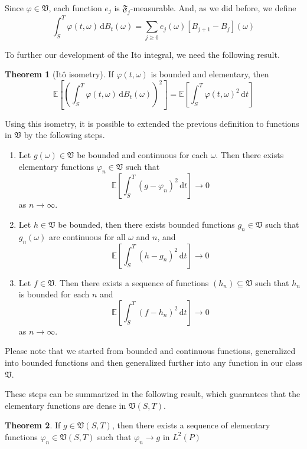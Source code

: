 \documentclass[12pt,a4paper]{article}
\theoremstyle{definition}
\newtheorem{theorem}{Theorem}[section]
\begin{document}
Since $\varphi \in \mathfrak{V}$, each function $e_j$ is $\mathfrak{F}_j$-measurable. And, as we did before, we define
\[
	\int_S^T \varphi (t, \omega) \, \mathrm{d}B_t(\omega) = \sum_{j \geq 0} e_j(\omega) [B_{j+1} - B_j](\omega)
\]

To further our development of the Ito integral, we need the following result.

\begin{theorem}[Itô isometry]
	If $\varphi(t, \omega)$ is bounded and elementary, then
	\[
		\mathbb{E}\left[\left( \int_S^T \varphi(t,\omega) \, \mathrm{d}B_t(\omega) \right)^2 \right] = \mathbb{E} \left[\int_S^T \varphi(t,\omega)^2 \, \mathrm{d}t \right]
	\]
\end{theorem}

Using this isometry, it is possible to extended the previous definition to functions in $\mathfrak{V}$ by the following steps.

\begin{enumerate}
	\item Let $g(\omega) \in \mathfrak{V}$ be bounded and continuous for each $\omega$. Then there exists elementary functions $\varphi_n \in \mathfrak{V}$ such that
	\[
		\mathbb{E} \left[ \int_S^T (g-\varphi_n)^2 \, \mathrm{d}t \right] \longrightarrow 0
	\]
	as $n \to \infty$.
	\item Let $h \in \mathfrak{V}$ be bounded, then there exists bounded functions $g_n \in \mathfrak{V}$ such that $g_n (\omega)$ are continuous for all $\omega$ and $n$, and
	\[
		\mathbb{E} \left[ \int_S^T (h-g_n)^2 \, \mathrm{d}t \right] \longrightarrow 0
	\]
	\item Let $f \in \mathfrak{V}$. Then there exists a sequence of functions $(h_n) \subseteq \mathfrak{V}$ such that $h_n$ is bounded for each $n$ and 
	\[
		\mathbb{E} \left[ \int_S^T (f-h_n)^2 \, \mathrm{d}t \right] \longrightarrow 0
	\]
	as $n \to \infty$.
\end{enumerate}

Please note that we started from bounded and continuous functions, generalized into bounded functions and then generalized further into any function in our class $\mathfrak{V}$.

These steps can be summarized in the following result, which guarantees that the elementary functions are dense in $\mathfrak{V}(S,T)$.

\begin{theorem}
If $g\in \mathfrak{V}(S,T)$, then there exists a sequence of elementary functions $\varphi_n\in \mathfrak{V}(S,T)$ such that $\varphi_n\to g$ in $L^2(P)$
\end{theorem}
\end{document}
